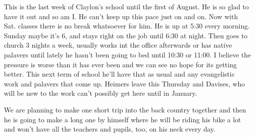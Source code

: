 \documentclass[]{book}
\begin{document}
This is the last week of Claylon's school until the first of August. He is so glad to have it out and so am I. He can't keep up this pace just on and on. Now with Sat. classes there is no break whatsoever for him. He is up at 5:30 every morning. Sunday maybe it's 6, and stays right on the job until 6:30 at night. Then goes to church 3 nights a week, usually works int the office afterwards or has native palavers until lately he hasn't been going to bed until 10:30 or 11:00. I believe the pressure is worse than it has ever been and we can see no hope for its getting better. This next term of school he'll have that as usual and any evangelistic work and palavers that come up. Heimers leave this Thursday and Davises, who will be new to the work can't possibly get here until in January.

We are planning to make one short trip into the back country together and then he is going to make a long one by himself where he will be riding his bike a lot and won't have all the teachers and pupils, too, on his neck every day.


\end{document}
